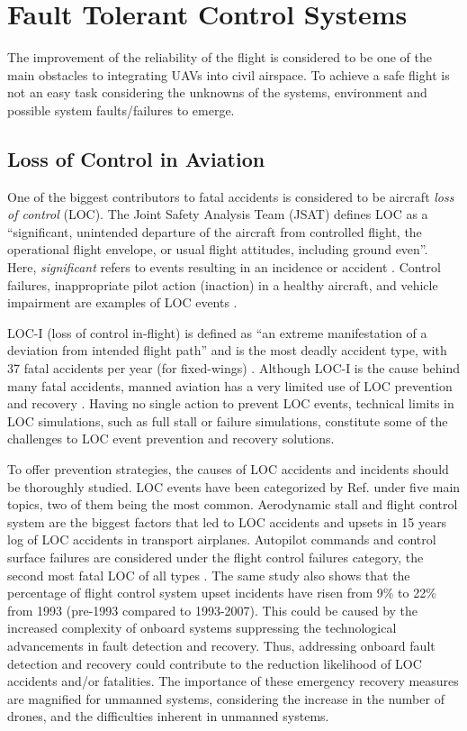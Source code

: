	
\section{Fault Tolerant Control Systems}

The improvement of the reliability of the flight is considered to be one of the main obstacles to integrating UAVs into civil airspace. 
To achieve a safe flight is not an easy task considering the unknowns of the systems, environment and possible system faults/failures to emerge. 

\subsection{Loss of Control in Aviation}

One of the biggest contributors to fatal accidents is considered to be aircraft \emph{loss of control} (LOC). 
The Joint Safety Analysis Team (JSAT) defines LOC as a ``significant, unintended departure of the aircraft from controlled flight, the operational flight envelope, or usual flight attitudes, including ground even''. Here, \emph{significant} refers to events resulting in an incidence or accident \cite{russell2000joint}. 
Control failures, inappropriate pilot action (inaction) in a healthy aircraft, and vehicle impairment are examples of LOC events \cite{richards2016vehicle}.

LOC-I (loss of control in-flight) is defined as ``an extreme manifestation of a deviation from intended flight path'' and is the most deadly accident type, with 37 fatal accidents per year (for fixed-wings) \cite{easa:LOC}.
Although LOC-I is the cause behind many fatal accidents, manned aviation has a very limited use of LOC prevention and recovery \cite{belcastro2017aircraft}. 
Having no single action to prevent LOC events, technical limits in LOC simulations, such as full stall or failure simulations, constitute some of the challenges to LOC event prevention and recovery solutions.

To offer prevention strategies, the causes of LOC accidents and incidents should be thoroughly studied. 
LOC events have been categorized by Ref.\cite{lambregts2008airplane} under five main topics, two of them being the most common. 
Aerodynamic stall and flight control system are the biggest factors that led to LOC accidents and upsets in 15 years log of LOC accidents in transport airplanes.
Autopilot commands and control surface failures are considered under the flight control failures category, the second most fatal LOC of all types \cite{lambregts2008airplane}. 
The same study also shows that the percentage of flight control system upset incidents have risen from 9\% to 22\% from 1993 (pre-1993 compared to 1993-2007).
This could be caused by the increased complexity of onboard systems suppressing the technological advancements in fault detection and recovery. 
Thus, addressing onboard fault detection and recovery could contribute to the reduction likelihood of LOC accidents and/or fatalities. 
The importance of these emergency recovery measures are magnified for unmanned systems, considering the increase in the number of drones, and the difficulties inherent in unmanned systems. 

